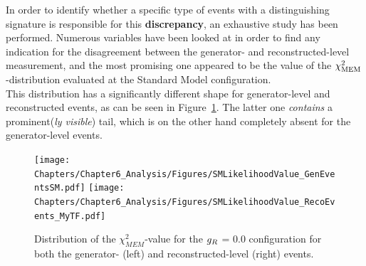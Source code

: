 In order to identify whether a specific type of events with a distinguishing signature is responsible for this \textbf{discrepancy}, an exhaustive study has been performed.
Numerous variables have been looked at in order to find any indication for the disagreement between the generator- and reconstructed-level measurement, and the most promising one appeared to be the value of the $\chi^{2}_{\textrm{MEM}}$-distribution evaluated at the Standard Model configuration.
\\
This distribution has a significantly different shape for generator-level and reconstructed events, as can be seen in Figure~\ref{fig::SMLik}.
The latter one \textit{contains} a prominent(\textit{ly visible}) tail, which is on the other hand completely absent for the generator-level events.
\\
\begin{figure}[h!t]
 \centering
 \texttt{[image: Chapters/Chapter6\_Analysis/Figures/SMLikelihoodValue\_GenEventsSM.pdf]} \hspace{0.3cm}
 \texttt{[image: Chapters/Chapter6\_Analysis/Figures/SMLikelihoodValue\_RecoEvents\_MyTF.pdf]}
 \caption{Distribution of the $\chi^{2}_{MEM}$-value for the $g_{R}$ = $0.0$ configuration for both the generator- (left) and reconstructed-level (right) events.} \label{fig::SMLik}
\end{figure}

